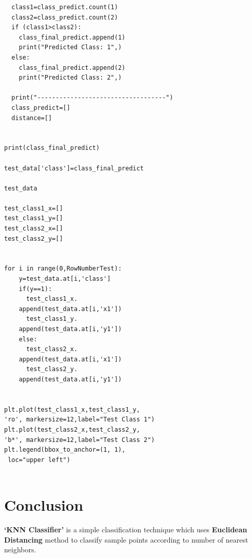 \documentclass[conference]{IEEEtran}
\begin{document}
\begin{lstlisting}
  class1=class_predict.count(1)
  class2=class_predict.count(2)
  if (class1>class2):
    class_final_predict.append(1)
    print("Predicted Class: 1",)
  else:
    class_final_predict.append(2)
    print("Predicted Class: 2",)

  print("-----------------------------------")  
  class_predict=[]
  distance=[]


print(class_final_predict)

test_data['class']=class_final_predict

test_data

test_class1_x=[]
test_class1_y=[]
test_class2_x=[]
test_class2_y=[]


for i in range(0,RowNumberTest):
    y=test_data.at[i,'class']
    if(y==1):
      test_class1_x.
	append(test_data.at[i,'x1'])
      test_class1_y.
	append(test_data.at[i,'y1'])
    else:
      test_class2_x.
	append(test_data.at[i,'x1'])
      test_class2_y.
	append(test_data.at[i,'y1'])


plt.plot(test_class1_x,test_class1_y,
'ro', markersize=12,label="Test Class 1")
plt.plot(test_class2_x,test_class2_y, 
'b*', markersize=12,label="Test Class 2")
plt.legend(bbox_to_anchor=(1, 1),
 loc="upper left")


\end{lstlisting}


\section{Conclusion}

\textbf{‘KNN Classifier’} is a simple classification technique which uses \textbf{Euclidean Distancing} method to classify sample points according to number of nearest neighbors. 
\end{document}
